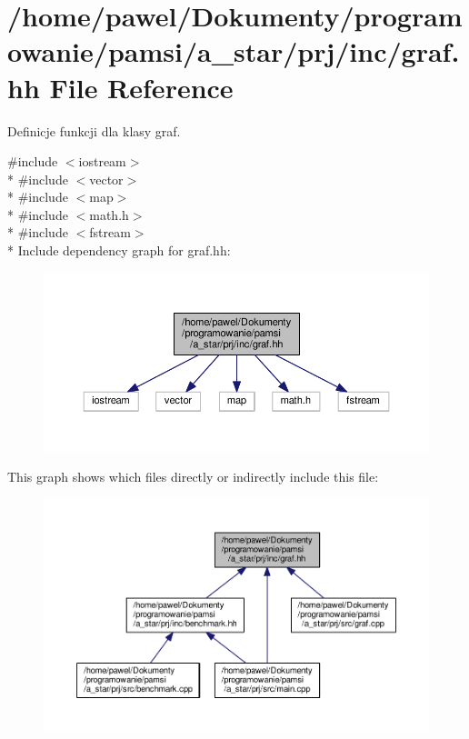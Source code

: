 \hypertarget{graf_8hh}{\section{/home/pawel/\-Dokumenty/programowanie/pamsi/a\-\_\-star/prj/inc/graf.hh File Reference}
\label{graf_8hh}
}


Definicje funkcji dla klasy graf.  


{\ttfamily \#include $<$iostream$>$}\\*
{\ttfamily \#include $<$vector$>$}\\*
{\ttfamily \#include $<$map$>$}\\*
{\ttfamily \#include $<$math.\-h$>$}\\*
{\ttfamily \#include $<$fstream$>$}\\*
Include dependency graph for graf.\-hh\-:\nopagebreak
\begin{figure}[H]
\begin{center}
\leavevmode
\includegraphics[width=350pt]{graf_8hh__incl}
\end{center}
\end{figure}
This graph shows which files directly or indirectly include this file\-:
\nopagebreak
\begin{figure}[H]
\begin{center}
\leavevmode
\includegraphics[width=350pt]{graf_8hh__dep__incl}
\end{center}
\end{figure}
